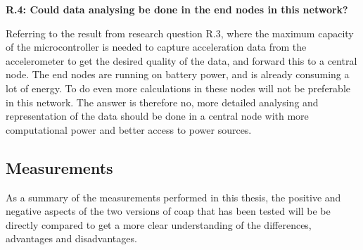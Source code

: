 \noindent\textbf{R.4: Could data analysing be done in the end nodes in this network?}

Referring to the result from research question R.3, where the maximum capacity of the \gls{microcontroller} is needed to capture acceleration data from the accelerometer to get the desired quality of the data, and forward this to a central node. The end nodes are running on battery power, and is already consuming a lot of energy. To do even more calculations in these nodes will not be preferable in this network. The answer is therefore no, more detailed analysing and representation of the data should be done in a central node with more computational power and better access to power sources. 

\subsection{Measurements}


\noindent As a summary of the measurements performed in this thesis, the positive and negative aspects of the two versions of \gls{coap} that has been tested will be be directly compared to get a more clear understanding of the differences, advantages and disadvantages.




